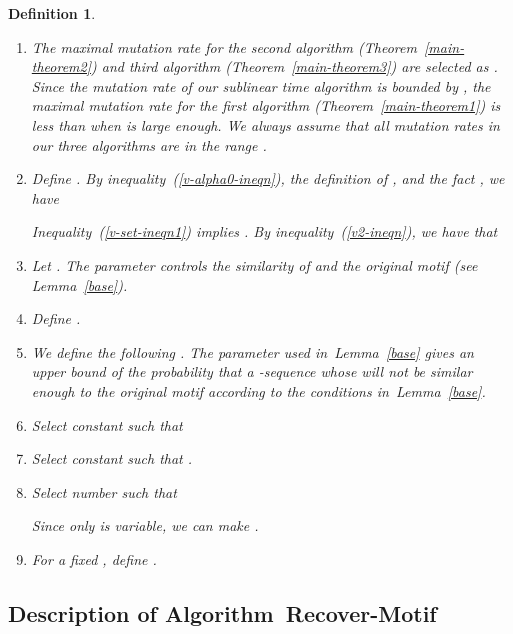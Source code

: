 \documentclass[11pt]{article}
\newtheorem{dfntn}[theoremfoo]{Definition}
\newenvironment{definition}{\pagebreak[1]\begin{dfntn}\rm}{\end{dfntn}}
\newcommand{\algmnam}{Recover-Motif}
\newcommand{\algmname}{Algorithm~\algmnam}
\newcommand{\algma}{\algmname~}
\begin{document}
\begin{definition}
\begin{enumerate}
\item
The maximal mutation rate  for the second algorithm
(Theorem~\ref{main-theorem2}) and third algorithm
(Theorem~\ref{main-theorem3}) are selected as . Since the
mutation rate of our sublinear time algorithm is bounded by , the maximal mutation rate  for the first
algorithm (Theorem~\ref{main-theorem1}) is less than  when
 is large enough. We always assume that all mutation rates
 in our three algorithms are in the range .



\item
Define . By inequality~(\ref{v-alpha0-ineqn}), the definition of , and
the fact , we have


Inequality~(\ref{v-set-ineqn1}) implies . By
inequality~(\ref{v2-ineqn}), we have that




\item\label{beta-def}
 Let
. The parameter  controls the
similarity of  and the original motif  (see
Lemma~\ref{base}).

\item
Define .




\item
We define the following . 
The parameter  used in~Lemma~\ref{base} gives an upper  bound
of the probability that a -sequence  whose
 will not be similar enough to the original motif 
according to the conditions in~Lemma~\ref{base}.


\item
Select constant  such that





\item
Select constant  such that .

\item
Select number  such that

Since only  is variable, we can make .





\item
For a fixed , define .
\end{enumerate}
\end{definition}



\subsection{Description of  \algma}\label{algorithm-sec}
\end{document}
